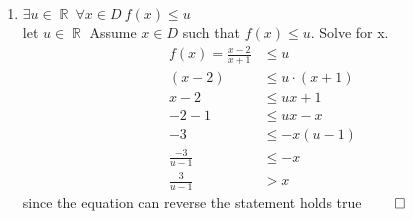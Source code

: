 \documentclass[11pt,twoside]{amsart}
\DeclareMathOperator*{\R}{\mathbb{R}} \DeclareMathOperator*{\N}{\mathbb{N}} \DeclareMathOperator*{\Q}{\mathbb{Q}} \DeclareMathOperator*{\Z}{\mathbb{Z}} \DeclareMathOperator*{\E}{\mathbb{E}} \DeclareMathOperator*{\C}{\mathbb{C}} \DeclareMathOperator*{\A}{\mathbb{A}}
\theoremstyle{definition}
\begin{document}
\begin{enumerate}[label= 1.\arabic*), itemsep=0.4cm]
  \item %
    $\exists u \in \R \ \forall x \in D \ f(x) \leq u$ \\
%
    let $u \in \R$ Assume $x\in D$ such that $f(x) \leq u$. Solve for x. 
    \begin{align*}
      f(x) = \frac{x-2}{x+1} &\leq u \\
                  (x-2) &\leq u \cdot (x+1) \\
                  x - 2 &\leq ux + 1\\
                  -2 -1 &\leq ux -x \\
                     -3 &\leq - x(u-1)\\
                     \frac{-3}{u-1} &\leq  -x \\
                     \frac{3}{u-1} &> x
    \end{align*}
    since the equation can reverse the statement holds true $\qed$
\end{enumerate}

\newpage
    
\end{document}
